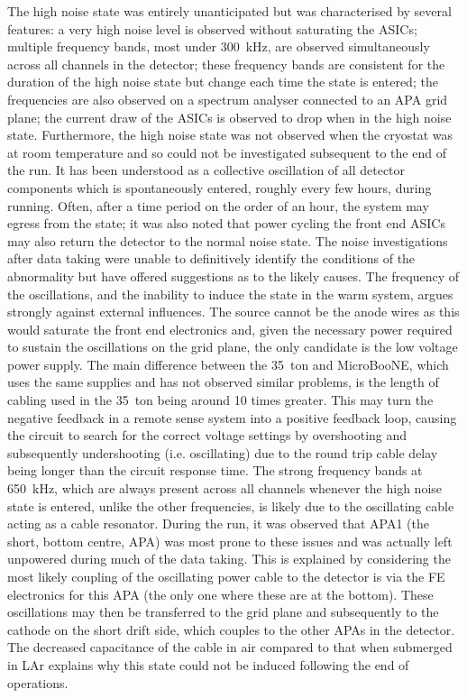The high noise state was entirely unanticipated but was characterised by several features: a very high noise level is observed without saturating the ASICs; multiple frequency bands, most under 300~kHz, are observed simultaneously across all channels in the detector; these frequency bands are consistent for the duration of the high noise state but change each time the state is entered; the frequencies are also observed on a spectrum analyser connected to an APA grid plane; the current draw of the ASICs is observed to drop when in the high noise state.  Furthermore, the high noise state was not observed when the cryostat was at room temperature and so could not be investigated subsequent to the end of the run.  It has been understood as a collective oscillation of all detector components which is spontaneously entered, roughly every few hours, during running.  Often, after a time period on the order of an hour, the system may egress from the state; it was also noted that power cycling the front end ASICs may also return the detector to the normal noise state.  The noise investigations after data taking were unable to definitively identify the conditions of the abnormality but have offered suggestions as to the likely causes.  The frequency of the oscillations, and the inability to induce the state in the warm system, argues strongly against external influences.  The source cannot be the anode wires as this would saturate the front end electronics and, given the necessary power required to sustain the oscillations on the grid plane, the only candidate is the low voltage power supply.  The main difference between the 35~ton and MicroBooNE, which uses the same supplies and has not observed similar problems, is the length of cabling used in the 35~ton being around 10 times greater.  This may turn the negative feedback in a remote sense system into a positive feedback loop, causing the circuit to search for the correct voltage settings by overshooting and subsequently undershooting (i.e. oscillating) due to the round trip cable delay being longer than the circuit response time.  The strong frequency bands at 650~kHz, which are always present across all channels whenever the high noise state is entered, unlike the other frequencies, is likely due to the oscillating cable acting as a cable resonator.  During the run, it was observed that APA1 (the short, bottom centre, APA) was most prone to these issues and was actually left unpowered during much of the data taking.  This is explained by considering the most likely coupling of the oscillating power cable  to the detector is via the FE electronics for this APA (the only one where these are at the bottom).  These oscillations may then be transferred to the grid plane and subsequently to the cathode on the short drift side, which couples to the other APAs in the detector.  The decreased capacitance of the cable in air compared to that when submerged in LAr explains why this state could not be induced following the end of operations.

